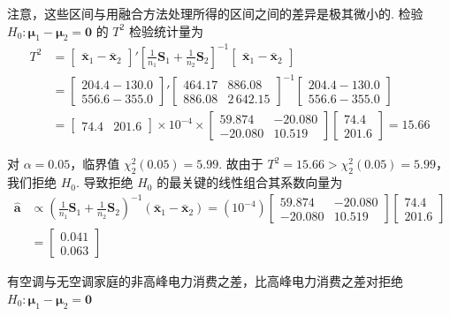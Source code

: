 注意，这些区间与用融合方法处理所得的区间之间的差异是极其微小的. 检验 $H_0: \boldsymbol{\mu}_1-\boldsymbol{\mu}_2=\mathbf{0}$ 的 $T^2$ 检验统计量为
\begin{align*}
T^2&=\begin{bmatrix}\bar{\mathbf{x}}_1-\bar{\mathbf{x}}_2\end{bmatrix}'\left[\frac{1}{n_1}\mathbf{S}_1+\frac{1}{n_2}\mathbf{S}_2\right]^{-1}\begin{bmatrix}\bar{\mathbf{x}}_1-\bar{\mathbf{x}}_2\end{bmatrix}\\
&=\begin{bmatrix}204.4-130.0\\556.6-355.0\end{bmatrix}'\begin{bmatrix}464.17&886.08\\886.08&2\,642.15\end{bmatrix}^{-1}\begin{bmatrix}204.4-130.0\\556.6-355.0\end{bmatrix}\\
&=\begin{bmatrix}74.4&201.6\end{bmatrix}\times 10^{-4}\times\begin{bmatrix}59.874&-20.080\\-20.080&10.519\end{bmatrix}\begin{bmatrix}74.4\\201.6\end{bmatrix}=15.66
\end{align*}

对 $\alpha=0.05$，临界值 $\chi_2^2(0.05)=5.99$. 故由于 $T^2=15.66>\chi_2^2(0.05)=5.99$，我们拒绝 $H_0$. 导致拒绝 $H_0$ 的最关键的线性组合其系数向量为
\begin{align*}
\hat{\mathbf{a}}&\propto\left(\frac{1}{n_1}\mathbf{S}_1+\frac{1}{n_2}\mathbf{S}_2\right)^{-1}(\bar{\mathbf{x}}_1-\bar{\mathbf{x}}_2)=(10^{-4})\begin{bmatrix}59.874&-20.080\\-20.080&10.519\end{bmatrix}\begin{bmatrix}74.4\\201.6\end{bmatrix}\\
&=\begin{bmatrix}0.041\\0.063\end{bmatrix}
\end{align*}

有空调与无空调家庭的非高峰电力消费之差，比高峰电力消费之差对拒绝 $H_0: \boldsymbol{\mu}_1-\boldsymbol{\mu}_2=\mathbf{0}$
